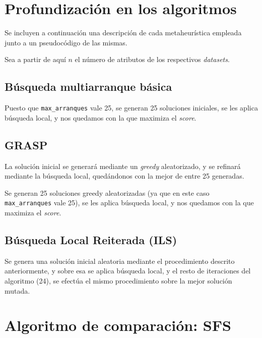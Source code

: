 \documentclass[a4paper,11pt]{article}
\begin{document}
\section{Profundización en los algoritmos}
Se incluyen a continuación una descripción de cada metaheurística empleada junto a un pseudocódigo de las mismas.

Sea a partir de aquí $n$ el número de atributos de los respectivos \textit{datasets}.
\subsection{Búsqueda multiarranque básica}
Puesto que \texttt{max\_arranques} vale 25, se generan 25 soluciones iniciales, se les aplica búsqueda local, y nos quedamos
con la que maximiza el \textit{score}.\\

\small{\texttt{}}
\normalsize

\subsection{GRASP}
La solución inicial se generará mediante un \textit{greedy} aleatorizado, y se refinará mediante
la búsqueda local, quedándonos con la mejor de entre 25 generadas.\\
   
\small\texttt{}
\normalsize

Se generan 25 soluciones greedy aleatorizadas (ya que en este caso \texttt{max\_arranques} vale 25), se les aplica búsqueda
local, y nos quedamos con la que maximiza el \textit{score}.\\

\small{\texttt{}}
\normalsize

\subsection{Búsqueda Local Reiterada (ILS)}
Se genera una solución inicial aleatoria mediante el procedimiento descrito anteriormente, y sobre esa se
aplica búsqueda local, y el resto de iteraciones del algoritmo (24), se efectúa el mismo procedimiento sobre la mejor solución
mutada.\\

\small{\texttt{}}
\normalsize

\section{Algoritmo de comparación: SFS}
\small{\texttt{}}
\end{document}
